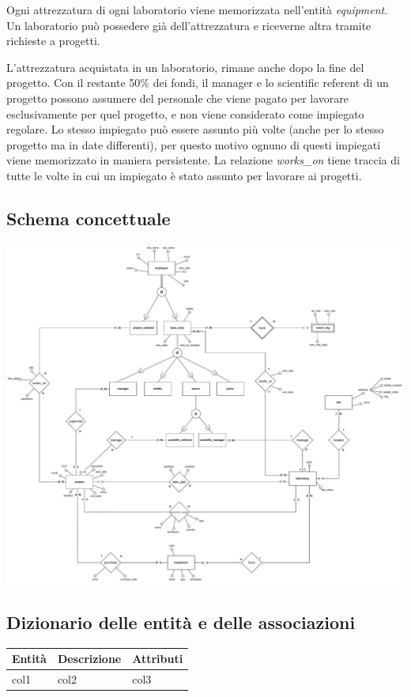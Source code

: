 Ogni attrezzatura di ogni laboratorio viene memorizzata nell'entità \textit{equipment}.\\
Un laboratorio può possedere già dell'attrezzatura e riceverne altra tramite richieste a progetti.

L'attrezzatura acquistata in un laboratorio, rimane anche dopo la fine del progetto.\sskip
Con il restante 50\% dei fondi, il manager e lo scientific referent di un progetto possono assumere del personale che viene pagato per lavorare esclusivamente per quel progetto, e non viene considerato come impiegato regolare.
Lo stesso impiegato può essere assunto più volte (anche per lo stesso progetto ma in date differenti), per questo motivo ognuno di questi impiegati viene memorizzato in maniera persistente.
La relazione \textit{works\_on} tiene traccia di tutte le volte in cui un impiegato è stato assunto per lavorare ai progetti.


\subsection{Schema concettuale}\bigskip
\includegraphics[width=\textwidth]{images/concettualeER.drawio.pdf}

\newpage
\subsection{Dizionario delle entità e delle associazioni}
\begin{tabular}{@{}| l | l | l |}
	\hline
	Entità & Descrizione & Attributi \\
	\hline
	col1   & col2        & col3      \\
	\hline
\end{tabular}
